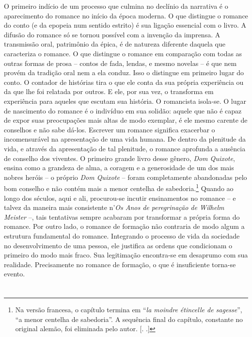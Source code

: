 O primeiro indício de um processo que culmina no declínio da
narrativa é o aparecimento do romance no início da época moderna. O que
distingue o romance do conto (e da epopeia num sentido estrito) é sua
ligação essencial com o livro. A difusão do romance só se tornou
possível com a invenção da imprensa. A transmissão oral, patrimônio da
épica, é de natureza diferente daquela que caracteriza o romance. O que
distingue o romance em comparação com todas as outras formas de prosa --
contos de fada, lendas, e mesmo novelas -- é que nem provém da tradição
oral nem a ela conduz. Isso o distingue em primeiro lugar do conto. O
contador de histórias tira o que ele conta da sua própria experiência ou
da que lhe foi relatada por outros. E ele, por sua vez, o transforma em
experiência para aqueles que escutam sua história. O romancista
isola-se. O lugar de nascimento do romance é o indivíduo em sua solidão:
aquele que não é capaz de expor suas preocupações mais altas de modo
exemplar, é ele mesmo carente de conselhos e não sabe dá-los. Escrever
um romance significa exacerbar o incomensurável na apresentação de uma
vida humana. De dentro da plenitude da vida, e através da apresentação
de tal plenitude, o romance aprofunda a ausência de conselho dos
viventes. O primeiro grande livro desse gênero, \emph{Dom Quixote},
ensina como a grandeza de alma, a coragem e a generosidade de um dos
mais nobres heróis -- o próprio \emph{Dom Quixote} -- foram
completamente abandonadas pelo bom conselho e não contém mais a menor
centelha de sabedoria.\footnote{Na versão francesa, o capítulo termina
  em ``\emph{la moindre étincelle de sagesse}'', ``a menor centelha de
  sabedoria''. A sequência final do capítulo, constante no original
  alemão, foi eliminada pelo autor. [. .]} Quando ao longo dos
séculos, aqui e ali, procurou-se incutir ensinamentos no romance -- e
talvez da maneira mais consistente n'\emph{Os Anos de peregrinação de
Wilhelm Meister} --, tais tentativas sempre acabaram por transformar a
própria forma do romance. Por outro lado, o romance de formação não
contraria de modo algum a estrutura fundamental do romance. Integrando o
processo de vida da sociedade no desenvolvimento de uma pessoa, ele
justifica as ordens que condicionam o primeiro do modo mais fraco. Sua
legitimação encontra-se em desaprumo com sua realidade. Precisamente no
romance de formação, o que é insuficiente torna-se evento.

\section{}

